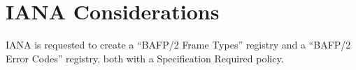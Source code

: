 \section{IANA Considerations}
IANA is requested to create a ``BAFP/2 Frame Types'' registry and a ``BAFP/2 Error Codes''
registry, both with a Specification Required policy.
